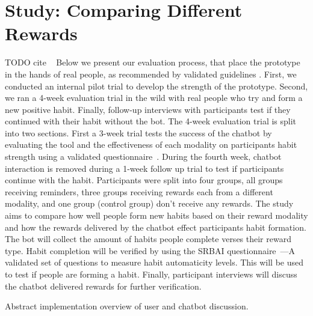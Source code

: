 \section{Study: Comparing Different Rewards}
TODO cite ~\cite{how_to_evaluate_tech_for_behaviour_change}\newline
Below we present our evaluation process, that place the prototype in the hands of real people, as recommended by validated guidelines \cite{article_mhealth}. First, we conducted an internal pilot trial to develop the strength of the prototype. Second, we ran a 4-week evaluation trial in the wild with real people who try and form a new positive habit. Finally, follow-up interviews with participants test if they continued with their habit without the bot.\newline
\newline
The 4-week evaluation trial is split into two sections. First a 3-week trial tests the success of the chatbot by evaluating the tool and the effectiveness of each modality on participants habit strength using a validated questionnaire~\cite{article_habit_measurement}. During the fourth week, chatbot interaction is removed during a 1-week follow up trial to test if participants continue with the habit. Participants were split into four groups, all groups receiving reminders, three groups receiving rewards each from a different modality, and one group (control group) don't receive any rewards.\newline
\newline
The study aims to compare how well people form new habits based on their reward modality and how the rewards delivered by the chatbot effect participants habit formation. The bot will collect the amount of habits people complete verses their reward type. Habit completion will be verified by using the SRBAI questionnaire~\cite{article_habit_measurement}---A validated set of questions to measure habit automaticity levels. This will be used to test if people are forming a habit. Finally, participant interviews will discuss the chatbot delivered rewards for further verification.


Abstract implementation overview of user and chatbot discussion.

